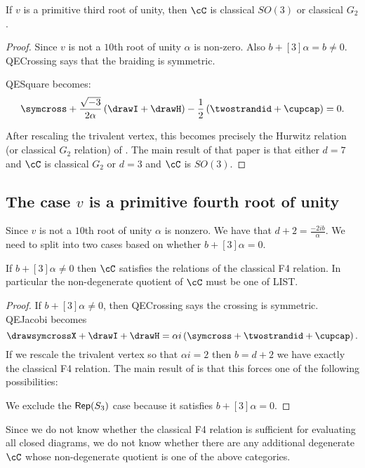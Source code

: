 \documentclass[12pt]{amsart}
\begin{document}
\begin{proposition}
If $v$ is a primitive third root of unity, then $\cC$ is classical $SO(3)$ or classical $G_2$.
\end{proposition}
\begin{proof}
Since $v$ is not a $10$th root of unity $\alpha$ is non-zero.  Also $b+[3]\alpha = b \neq 0$.  QECrossing says that the braiding is symmetric.  

QESquare becomes:
$$\symcross+\frac{\sqrt{-3}}{2\alpha} \left(\drawI + \drawH \right) -\frac{1}{2} \left(\twostrandid + \cupcap \right) = 0.$$

After rescaling the trivalent vertex, this becomes precisely the Hurwitz relation (or classical $G_2$ relation) of \cite{}.  The main result of that paper is that either $d = 7$ and $\cC$ is classical $G_2$ or $d=3$ and $\cC$ is $SO(3)$.
\end{proof}

\subsection{The case \texorpdfstring{$v$}{v} is a primitive fourth root of unity}

Since $v$ is not a $10$th root of unity $\alpha$ is nonzero.  We have that $d+2 = \frac{-2ib}{\alpha}$.
We need to split into two cases based on whether $b+[3]\alpha = 0$.  

\begin{proposition}
If $b+[3]\alpha \neq 0$ then $\cC$ satisfies the relations of the classical F4 relation.  In particular the non-degenerate quotient of $\cC$ must be one of LIST.
\end{proposition}
\begin{proof}
If $b+[3]\alpha \neq 0$, then QECrossing says the crossing is symmetric.   QEJacobi becomes
$$\drawsymcrossX + \drawI + \drawH = \alpha i \left(\symcross + \twostrandid + \cupcap \right).$$  If we rescale the trivalent vertex so that $\alpha i = 2$ then $b = d+2$ we have exactly the classical F4 relation.  The main result of \cite{F4E6} is that this forces one of the following possibilities:


We exclude the $\operatorname{\mathsf{Rep}}(S_3)$ case because it satisfies $b+[3]\alpha = 0$.
\end{proof}

Since we do not know whether the classical F4 relation is sufficient for evaluating all closed diagrams, we do not know whether there are any additional degenerate $\cC$ whose non-degenerate quotient is one of the above categories.
\end{document}
